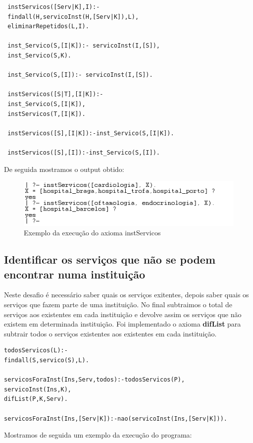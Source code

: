 \begin{verbatim}
 instServicos([Serv|K],I):-    
 findall(H,servicoInst(H,[Serv|K]),L),
 eliminarRepetidos(L,I).
 
 inst_Servico(S,[I|K]):- servicoInst(I,[S]),
 inst_Servico(S,K).  
 
 inst_Servico(S,[I]):- servicoInst(I,[S]).
 
 instServicos([S|T],[I|K]):-
 inst_Servico(S,[I|K]),
 instServicos(T,[I|K]).
 
 instServicos([S],[I|K]):-inst_Servico(S,[I|K]).
 
 instServicos([S],[I]):-inst_Servico(S,[I]).
\end{verbatim}

De seguida mostramos o output obtido: 

\begin{figure}[<+htpb+>]
	\centering
	\includegraphics[scale=0.9]{answer5.png}
	\caption{Exemplo da execução do axioma instServicos}
	\label{p3:fig:output5}
\end{figure}

\subsection{Identificar os serviços que não se podem encontrar numa instituição}
Neste desafio é necessário saber quais os serviços exitentes, depois saber quais os serviços que fazem parte de uma instituição. No final subtraimos o total de serviços aos existentes em cada instituição e devolve assim os serviços que não existem em determinada instituição. Foi implementado o axioma \textbf{difList} para subtrair todos o serviços existentes aos existentes em cada instituição. 

\begin{verbatim}
todosServicos(L):-
findall(S,servico(S),L).

servicosForaInst(Ins,Serv,todos):-todosServicos(P), 
servicoInst(Ins,K),
difList(P,K,Serv).

servicosForaInst(Ins,[Serv|K]):-nao(servicoInst(Ins,[Serv|K])).
\end{verbatim}

Mostramos de seguida um exemplo da execução do programa: 

